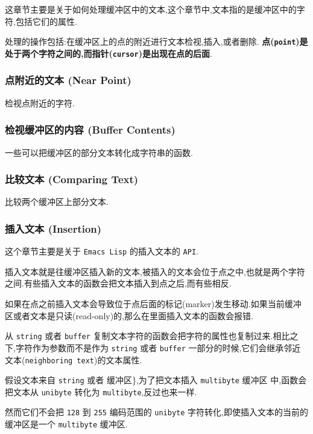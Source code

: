 \documentclass[11pt]{article}
\begin{document}
这章节主要是关于如何处理缓冲区中的文本,这个章节中,文本指的是缓冲区中的字符,包括它们的属性.

处理的操作包括:在缓冲区上的点的附近进行文本检视,插入,或者删除. \textbf{点(\texttt{point})是处于两个字符之间的,而指针(\texttt{cursor})是出现在点的后面}.

\subsubsection{点附近的文本 (Near Point)}
\label{sec:org7ff2fd6}

检视点附近的字符.


\subsubsection{检视缓冲区的内容 (Buffer Contents)}
\label{sec:orgb2f1052}

一些可以把缓冲区的部分文本转化成字符串的函数.


\subsubsection{比较文本 (Comparing Text)}
\label{sec:org8557cad}

比较两个缓冲区上部分文本.



\subsubsection{插入文本 (Insertion)}
\label{sec:orgc30ad0a}

这个章节主要是关于 \texttt{Emacs Lisp} 的插入文本的 \texttt{API}.

插入文本就是往缓冲区插入新的文本,被插入的文本会位于点之中,也就是两个字符之间.有些插入文本的函数会把文本插入到点之后,而有些相反.

如果在点之前插入文本会导致位于点后面的标记(marker)发生移动.如果当前缓冲区或者文本是只读(read-only)的,那么在里面插入文本的函数会报错.

从 \texttt{string} 或者 \texttt{buffer} 复制文本字符的函数会把字符的属性也复制过来.相比之下,字符作为参数而不是作为 \texttt{string} 或者 \texttt{buffer} 一部分的时候,它们会继承邻近文本(\texttt{neighboring text})的文本属性.

假设文本来自 \texttt{string} 或者 缓冲区\},为了把文本插入 \texttt{multibyte} 缓冲区 中,函数会把文本从 \texttt{unibyte} 转化为 \texttt{multibyte},反过也来一样.

然而它们不会把 \texttt{128} 到 \texttt{255} 编码范围的 \texttt{unibyte} 字符转化,即使插入文本的当前的缓冲区是一个 \texttt{multibyte} 缓冲区.
\end{document}
